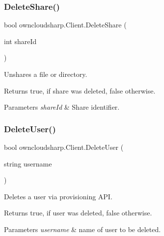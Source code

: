 \subsubsection{\texorpdfstring{Delete\+Share()}{DeleteShare()}}
{\footnotesize\ttfamily bool owncloudsharp.\+Client.\+Delete\+Share (\begin{DoxyParamCaption}\item[{int}]{share\+Id }\end{DoxyParamCaption})}



Unshares a file or directory. 

\begin{DoxyReturn}{Returns}
{\ttfamily true}, if share was deleted, {\ttfamily false} otherwise.
\end{DoxyReturn}

\begin{DoxyParams}{Parameters}
{\em share\+Id} & Share identifier.\\
\hline
\end{DoxyParams}
\mbox{\label{classowncloudsharp_1_1_client_a0603de03c323c55dc53cea24516ecf31}} 
\subsubsection{\texorpdfstring{Delete\+User()}{DeleteUser()}}
{\footnotesize\ttfamily bool owncloudsharp.\+Client.\+Delete\+User (\begin{DoxyParamCaption}\item[{string}]{username }\end{DoxyParamCaption})}



Deletes a user via provisioning A\+PI. 

\begin{DoxyReturn}{Returns}
{\ttfamily true}, if user was deleted, {\ttfamily false} otherwise.
\end{DoxyReturn}

\begin{DoxyParams}{Parameters}
{\em username} & name of user to be deleted.\\
\hline
\end{DoxyParams}
\mbox{\label{classowncloudsharp_1_1_client_a77306ba08609c9cf128e62b955227648}} 
